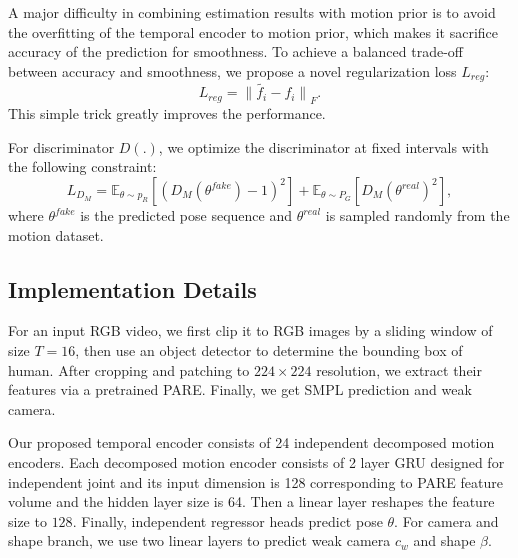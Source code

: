 \documentclass{svproc}
\begin{document}
A major difficulty in combining estimation results with motion prior is to avoid the overfitting of the temporal encoder to motion prior, which makes it sacrifice accuracy of the prediction for smoothness. To achieve a balanced trade-off between accuracy and smoothness, we propose a novel regularization loss $L_{reg}$:
\begin{equation}
    L_{reg}={\lVert \tilde{f_i}-f_i\rVert}_F.
\end{equation}
This simple trick greatly improves the performance.

For discriminator $D(.)$, we optimize the discriminator at fixed intervals with the following constraint:
\begin{equation}
    L_{D_M}=\mathbb{E}_{\theta \sim p_R}[(D_M(\theta^{fake})-1)^2]+\mathbb{E}_{\theta \sim P_G}[D_M(\theta^{real})^2] ,
\end{equation}
where $\theta^{fake}$ is the predicted pose sequence and $\theta^{real}$ is sampled randomly from the motion dataset.

\subsection{Implementation Details}

For an input RGB video, we first clip it to RGB images by a sliding window of size $T=16$, then use an object detector \cite{redmon2018yolov3} to determine the bounding box of human. After cropping and patching to $224 \times 224$ resolution, we extract their features via a pretrained PARE. Finally, we get SMPL prediction and weak camera.


Our proposed temporal encoder consists of 24 independent decomposed motion encoders. Each decomposed motion encoder consists of 2 layer GRU designed for independent joint and its input dimension is 128 corresponding to PARE feature volume and the hidden layer size is 64. Then a linear layer reshapes the feature size to $128$. Finally, independent regressor heads predict pose $\theta$. For camera and shape branch, we use two linear layers to predict weak camera $c_w$ and shape $\beta$.
\end{document}
